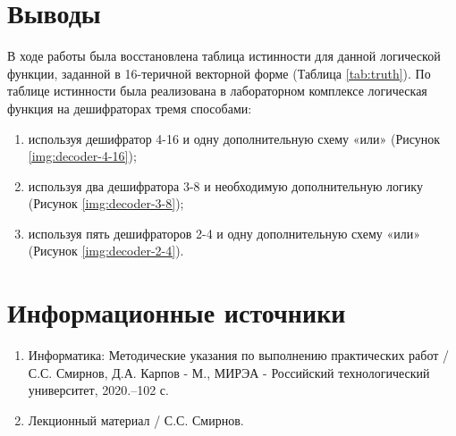 \documentclass[a4paper]{article}
\begin{document}
	\section{Выводы}\label{sec:conclusion}
	В ходе работы была восстановлена таблица истинности для данной логической функции, заданной в 16-теричной векторной форме (Таблица \ref{tab:truth}). По таблице истинности была реализована в лабораторном комплексе логическая функция на дешифраторах тремя способами:
	\begin{enumerate}
	\item используя дешифратор 4-16 и одну дополнительную схему «или» (Рисунок \ref{img:decoder-4-16});
	\item используя два дешифратора 3-8 и необходимую дополнительную логику (Рисунок \ref{img:decoder-3-8});
	\item используя пять дешифраторов 2-4 и одну дополнительную схему «или» (Рисунок \ref{img:decoder-2-4}).
	\end{enumerate}
	
	
	
	
	\section{Информационные источники}\label{sec:sources}
	\begin{enumerate}
		\item Информатика: Методические указания по выполнению практических 
		работ / С.С. Смирнов, Д.А. Карпов - М., МИРЭА - Российский технологический университет, 2020.–102 с.
		\item Лекционный материал / С.С. Смирнов.
	\end{enumerate}
	
\end{document}
